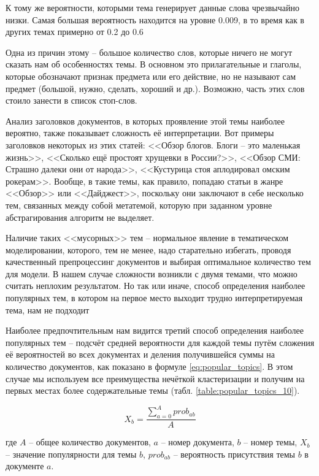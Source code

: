 К тому же вероятности, которыми тема генерирует данные слова чрезвычайно низки. Самая большая вероятность находится на уровне 0.009, в то время как в других темах примерно от 0.2 до 0.6

Одна из причин этому -- большое количество слов, которые ничего не могут сказать нам об особенностях темы. В основном это прилагательные и глаголы, которые обозначают признак предмета или его действие, но не называют сам предмет (большой, нужно, сделать, хороший и др.). Возможно, часть этих слов стоило занести в список стоп-слов.

Анализ заголовков документов, в которых проявление этой темы наиболее вероятно, также показывает сложность её интерпретации. Вот примеры заголовков некоторых из этих статей: <<Обзор блогов. Блоги – это маленькая жизнь>>, <<Сколько ещё простоят хрущевки в России?>>, <<Обзор СМИ: Страшно далеки они от народа>>, <<Кустурица стоя аплодировал омским рокерам>>. Вообще, в такие темы, как правило, попадаю статьи в жанре <<Обзор>> или <<Дайджест>>, поскольку они заключают в себе несколько тем, связанных между собой метатемой, которую при заданном уровне абстрагирования алгоритм не выделяет.

Наличие таких <<мусорных>> тем -- нормальное явление в тематическом моделировании, которого, тем не менее, надо старательно избегать, проводя качественный препроцессинг документов и выбирая оптимальное количество тем для модели. В нашем случае сложности возникли с двумя темами, что можно считать неплохим результатом. Но так или иначе, способ определения наиболее популярных тем, в котором на первое место выходит трудно интерпретируемая тема, нам не подходит

Наиболее предпочтительным нам видится третий способ определения наиболее популярных тем -- подсчёт средней вероятности для каждой темы путём сложения её вероятностей во всех документах и деления получившейся суммы на количество документов, как показано в формуле \ref{eq:popular_topics}. В этом случае мы используем все преимущества нечёткой кластеризации и получим на первых местах более содержательные темы (табл. \ref{table:popular_topics_10}).

\begin{equation}\label{eq:popular_topics}
X_b = \frac{\sum_{a=0}^{A} prob_{ab}}{A}
\end{equation}

где $A$ -- общее количество документов, $a$ -- номер документа, $b$ -- номер темы, $X_b$ -- значение популярности для темы $b$, $prob_{ab}$ -- вероятность присутствия темы $b$ в документе $a$.

